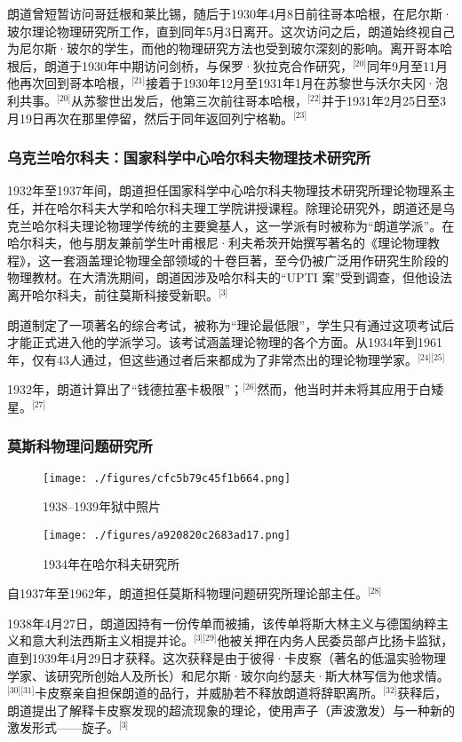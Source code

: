 朗道曾短暂访问哥廷根和莱比锡，随后于1930年4月8日前往哥本哈根，在尼尔斯·玻尔理论物理研究所工作，直到同年5月3日离开。这次访问之后，朗道始终视自己为尼尔斯·玻尔的学生，而他的物理研究方法也受到玻尔深刻的影响。离开哥本哈根后，朗道于1930年中期访问剑桥，与保罗·狄拉克合作研究，\(^\text{[20]}\)同年9月至11月他再次回到哥本哈根，\(^\text{[21]}\)接着于1930年12月至1931年1月在苏黎世与沃尔夫冈·泡利共事。\(^\text{[20]}\)从苏黎世出发后，他第三次前往哥本哈根，\(^\text{[22]}\)并于1931年2月25日至3月19日再次在那里停留，然后于同年返回列宁格勒。\(^\text{[23]}\)
\subsubsection{乌克兰哈尔科夫：国家科学中心哈尔科夫物理技术研究所}
1932年至1937年间，朗道担任国家科学中心哈尔科夫物理技术研究所理论物理系主任，并在哈尔科夫大学和哈尔科夫理工学院讲授课程。除理论研究外，朗道还是乌克兰哈尔科夫理论物理学传统的主要奠基人，这一学派有时被称为“朗道学派”。在哈尔科夫，他与朋友兼前学生叶甫根尼·利夫希茨开始撰写著名的《理论物理教程》，这一套涵盖理论物理全部领域的十卷巨著，至今仍被广泛用作研究生阶段的物理教材。在大清洗期间，朗道因涉及哈尔科夫的“UPTI 案”受到调查，但他设法离开哈尔科夫，前往莫斯科接受新职。\(^\text{[3]}\)

朗道制定了一项著名的综合考试，被称为“理论最低限”，学生只有通过这项考试后才能正式进入他的学派学习。该考试涵盖理论物理的各个方面。从1934年到1961年，仅有43人通过，但这些通过者后来都成为了非常杰出的理论物理学家。\(^\text{[24][25]}\)

1932年，朗道计算出了“钱德拉塞卡极限”；\(^\text{[26]}\)然而，他当时并未将其应用于白矮星。\(^\text{[27]}\)
\subsubsection{莫斯科物理问题研究所}
\begin{figure}[ht]
\centering
\texttt{[image: ./figures/cfc5b79c45f1b664.png]}
\caption{1938–1939年狱中照片} \label{fig_LFLD_3}
\end{figure}
\begin{figure}[ht]
\centering
\texttt{[image: ./figures/a920820c2683ad17.png]}
\caption{1934年在哈尔科夫研究所} \label{fig_LFLD_4}
\end{figure}
自1937年至1962年，朗道担任莫斯科物理问题研究所理论部主任。\(^\text{[28]}\)

1938年4月27日，朗道因持有一份传单而被捕，该传单将斯大林主义与德国纳粹主义和意大利法西斯主义相提并论。\(^\text{[3][29]}\)他被关押在内务人民委员部卢比扬卡监狱，直到1939年4月29日才获释。这次获释是由于彼得·卡皮察（著名的低温实验物理学家、该研究所创始人及所长）和尼尔斯·玻尔向约瑟夫·斯大林写信为他求情。\(^\text{[30][31]}\)卡皮察亲自担保朗道的品行，并威胁若不释放朗道将辞职离所。\(^\text{[32]}\)获释后，朗道提出了解释卡皮察发现的超流现象的理论，使用声子（声波激发）与一种新的激发形式——旋子。\(^\text{[3]}\)

